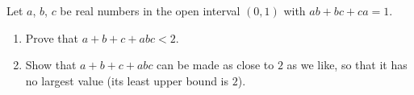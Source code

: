 Let $a$, $b$, $c$ be real numbers in the open interval $(0,1)$ with $ab+bc+ca=1$.
\begin{enumerate}
\item[(a)] Prove that $a+b+c+abc<2$.
\item[(b)] Show that $a+b+c+abc$ can be made as close to $2$ as we like, so that it has no largest value (its least upper bound is $2$).
\end{enumerate}
